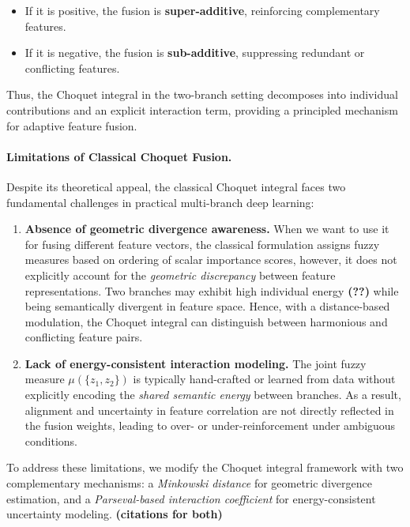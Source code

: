 \documentclass[preprint,12pt]{elsarticle}
\begin{document}
\begin{itemize}
    \item If it is positive, the fusion is \textbf{super-additive}, reinforcing complementary features.
    \item If it is negative, the fusion is \textbf{sub-additive}, suppressing redundant or conflicting features.
\end{itemize}

Thus, the Choquet integral in the two-branch setting decomposes into individual contributions and an explicit interaction term, providing a principled mechanism for adaptive feature fusion.

\paragraph{Limitations of Classical Choquet Fusion.}
Despite its theoretical appeal, the classical Choquet integral faces two fundamental challenges in practical multi-branch deep learning:

\begin{enumerate}
    \item \textbf{Absence of geometric divergence awareness.} When we want to use it for fusing different feature vectors, the classical formulation assigns fuzzy measures based on ordering of scalar importance scores, however, it does not explicitly account for the \emph{geometric discrepancy} between feature representations. Two branches may exhibit high individual energy \textbf{(??)} while being semantically divergent in feature space. Hence, with a distance-based modulation, the Choquet integral can distinguish between harmonious and conflicting feature pairs.

    \item \textbf{Lack of energy-consistent interaction modeling.} The joint fuzzy measure $\mu(\{z_1, z_2\})$ is typically hand-crafted or learned from data without explicitly encoding the \emph{shared semantic energy} between branches. As a result, alignment and uncertainty in feature correlation are not directly reflected in the fusion weights, leading to over- or under-reinforcement under ambiguous conditions.
\end{enumerate}

To address these limitations, we modify the Choquet integral framework with two complementary mechanisms: a \textit{Minkowski distance} for geometric divergence estimation, and a \textit{Parseval-based interaction coefficient} for energy-consistent uncertainty modeling. \textbf{(citations for both)}
\end{document}
